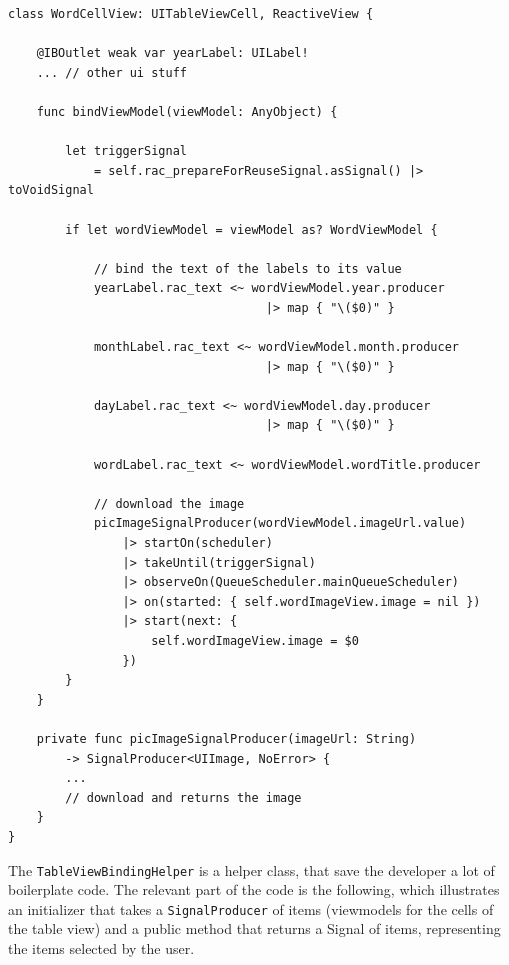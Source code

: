\begin{verbatim}
class WordCellView: UITableViewCell, ReactiveView {

    @IBOutlet weak var yearLabel: UILabel!
    ... // other ui stuff

    func bindViewModel(viewModel: AnyObject) {

        let triggerSignal 
        	= self.rac_prepareForReuseSignal.asSignal() |> toVoidSignal

        if let wordViewModel = viewModel as? WordViewModel {
        
            // bind the text of the labels to its value
            yearLabel.rac_text <~ wordViewModel.year.producer 
            						|> map { "\($0)" }
            						
            monthLabel.rac_text <~ wordViewModel.month.producer 
            						|> map { "\($0)" }
            						
            dayLabel.rac_text <~ wordViewModel.day.producer 
            						|> map { "\($0)" }
            						
            wordLabel.rac_text <~ wordViewModel.wordTitle.producer

            // download the image
            picImageSignalProducer(wordViewModel.imageUrl.value)
                |> startOn(scheduler)
                |> takeUntil(triggerSignal)
                |> observeOn(QueueScheduler.mainQueueScheduler)
                |> on(started: { self.wordImageView.image = nil })
                |> start(next: {
                    self.wordImageView.image = $0
                })
        }
    }

    private func picImageSignalProducer(imageUrl: String)
        -> SignalProducer<UIImage, NoError> {
        ...
        // download and returns the image
    }
}
\end{verbatim}

The \texttt{TableViewBindingHelper} is a helper class, that save the
developer a lot of boilerplate code. The relevant part of the code is
the following, which illustrates an initializer that takes a
\texttt{SignalProducer} of items (viewmodels for the cells of the table
view) and a public method that returns a Signal of items, representing
the items selected by the user.

